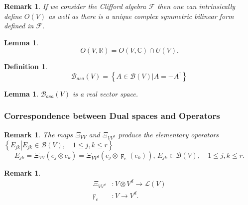 \documentclass[aps,preprint]{revtex4}%
\newtheorem{definition}[theorem]{Definition}
\newtheorem{lemma}[theorem]{Lemma}
\newtheorem{remark}[theorem]{Remark}
\begin{document}
\begin{remark}
If we consider the Clifford algebra $\mathcal{F}$ then one can intrinsically
define $O\left(  V\right)  $ as well as there is a unique complex symmetric
bilinear form defined in $\mathcal{F}$.
\end{remark}

\begin{lemma}%
\begin{equation}
O\left(  V,\mathbb{R}\right)  =O\left(  V,\mathbb{C}\right)  \cap U\left(
V\right)  .
\end{equation}

\end{lemma}

\begin{definition}%
\begin{equation}
\mathcal{B}_{asa}\left(  V\right)  =\left\{  \left.  A\in\mathcal{B}\left(
V\right)  \right\vert A=-A^{\dagger}\right\}
\end{equation}

\end{definition}

\begin{lemma}
$\mathcal{B}_{asa}\left(  V\right)  $ is a real vector space.
\end{lemma}

\subsubsection{Correspondence between Dual spaces and Operators
\label{Correspondence between Dual spaces and Operators}}

\begin{remark}
The maps $\mathcal{\Xi}_{VV}$ and $\mathcal{\Xi}_{VV^{d}}$ produce the
elementary operators $\left\{  \left.  E_{jk}\right\vert E_{jk}\in
\mathcal{B}\left(  V\right)  ,\quad1\leq j,k\leq r\right\}  $
\[
E_{jk}=\mathcal{\Xi}_{VV}\left(  e_{j}\otimes e_{k}\right)  =\mathcal{\Xi
}_{VV^{d}}\left(  e_{j}\otimes\digamma_{e}\left(  e_{k}\right)  \right)
,\,E_{jk}\in\mathcal{B}\left(  V\right)  ,\quad1\leq j,k\leq r.
\]

\end{remark}

\begin{remark}%
\begin{align}
\mathcal{\Xi}_{VV^{d}}  &  :V\otimes V^{d}\rightarrow\mathcal{L}\left(
V\right) \\
\digamma_{e}  &  :V\rightarrow V^{d}.
\end{align}

\end{remark}
\end{document}
